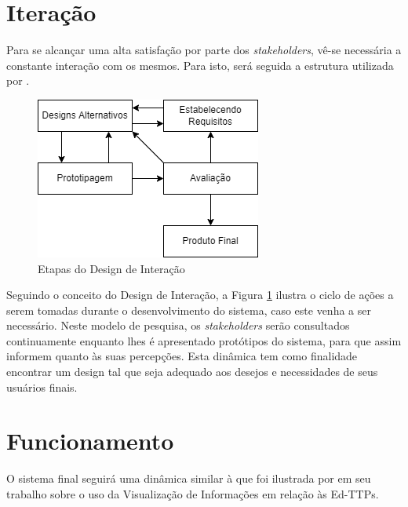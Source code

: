     \section{Iteração}

        Para se alcançar uma alta satisfação por parte dos \textit{stakeholders}, vê-se necessária a constante interação com os mesmos. Para isto, será seguida a estrutura utilizada por \cite{andre_interaction_2018}.

        \begin{figure}[htbp]\centering
            \caption{\label{fig:IxD} Etapas do Design de Interação}
            \includegraphics[scale=1]{files/img/Arquitetura/Arquitetura-IxD.png}
        \end{figure}    %

        Seguindo o conceito do Design de Interação, a Figura \ref{fig:IxD} ilustra o ciclo de ações a serem tomadas durante o desenvolvimento do sistema, caso este venha a ser necessário. Neste modelo de pesquisa, os \textit{stakeholders} serão consultados continuamente enquanto lhes é apresentado protótipos do sistema, para que assim informem quanto às suas percepções. Esta dinâmica tem como finalidade encontrar um design tal que seja adequado aos desejos e necessidades de seus usuários finais. 

    \section{Funcionamento}

        O sistema final seguirá uma dinâmica similar à que foi ilustrada por \cite{bebis_information_2019} em seu trabalho sobre o uso da Visualização de Informações em relação às Ed-TTPs.

